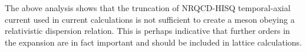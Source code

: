 The above analysis shows that the truncation of NRQCD-HISQ temporal-axial current used in current calculations is not sufficient to create a meson obeying a relativistic dispersion relation. This is perhaps indicative that further orders in the expansion are in fact important and should be included in lattice calculations. 




